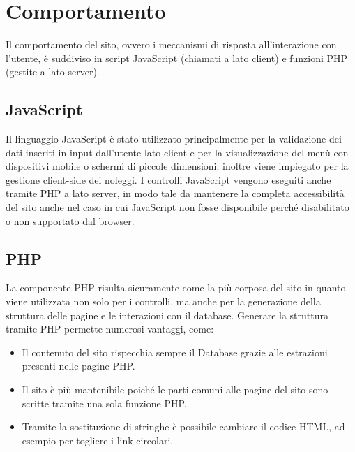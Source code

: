 \section{Comportamento}
Il comportamento del sito, ovvero i meccanismi di risposta all'interazione con l'utente, è suddiviso in script JavaScript (chiamati a lato client) e funzioni PHP (gestite a lato server).
    \subsection{JavaScript}
        Il linguaggio JavaScript è stato utilizzato principalmente per la validazione dei dati inseriti in input dall'utente lato client e per la visualizzazione del menù con dispositivi mobile o schermi di piccole dimensioni; inoltre viene impiegato per la gestione client-side dei noleggi.
        I controlli JavaScript vengono eseguiti anche tramite PHP a lato server, in modo tale da mantenere la completa accessibilità del sito anche nel caso in cui JavaScript non fosse disponibile perché disabilitato o non supportato dal browser.
    \subsection{PHP}
        La componente PHP risulta sicuramente come la più corposa del sito in quanto viene utilizzata non solo per i controlli, ma anche per la generazione della struttura delle pagine e le interazioni con il database.
        Generare la struttura tramite PHP permette numerosi vantaggi, come:
        \begin{itemize}
            \item Il contenuto del sito rispecchia sempre il Database grazie alle estrazioni presenti nelle pagine PHP.
            \item Il sito è più mantenibile poiché le parti comuni alle pagine del sito sono scritte tramite una sola funzione PHP.
            \item Tramite la sostituzione di stringhe è possibile cambiare il codice HTML, ad esempio per togliere i link circolari.
        \end{itemize}
\pagebreak
